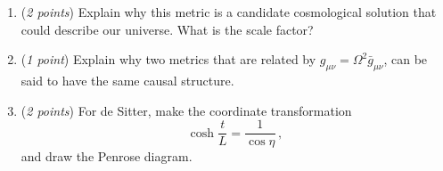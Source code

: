 \documentclass[12pt]{article}
\newcommand{\be}{\begin{equation}}
\newcommand{\ee}{\end{equation}}
\begin{document}
\begin{enumerate}[label=\alph*)]
\item (\emph{2 points}) Explain why this metric is a candidate cosmological solution that could describe our universe. What is the scale factor?  
\item (\emph{1 point}) Explain why two metrics that are related by $g_{\mu\nu} = \Omega^2 \bar g_{\mu\nu}$, can be said to have the same causal structure. 
\item (\emph{2 points}) For de Sitter, make the coordinate transformation
\be
\cosh \frac{t}{L} = \frac{1}{\cos \eta} \,,
\ee
and draw the Penrose diagram. 
\end{enumerate}

\vspace{1em}
\\
\end{document}
